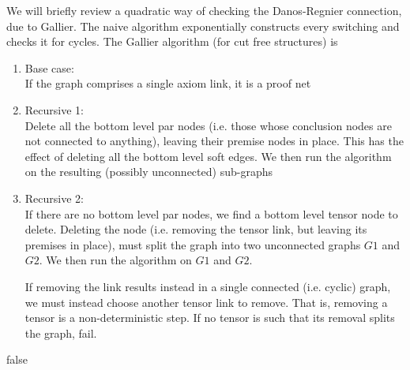We will briefly review a quadratic way of checking the Danos-Regnier connection,
due to Gallier.  The naive algorithm exponentially constructs every switching
and checks it for cycles.  The Gallier algorithm (for cut free structures) is
\begin{enumerate}
\item Base case: \\
If the graph comprises a single axiom link, it is a proof net
\item Recursive 1:\\
Delete all the bottom level par nodes (i.e. those whose conclusion nodes are
not connected to anything), leaving their premise nodes in place.  This
has the effect of deleting all the bottom level soft edges.
We then run the algorithm on the resulting (possibly unconnected) sub-graphs
\item Recursive 2:\\
If there are no bottom level par nodes, we find a bottom level tensor node to
delete.  Deleting the node (i.e. removing the tensor link, but leaving its
premises in place), must split the graph into two unconnected graphs $G1$ and $G2$.
We then run the algorithm on $G1$ and $G2$.

If removing the link results instead in a single connected (i.e. cyclic) graph,
we must instead choose another tensor link to remove.  That is, removing
a tensor is a non-deterministic step.  If no tensor is such that its removal
splits the graph, fail.
\end{enumerate}

\if false

